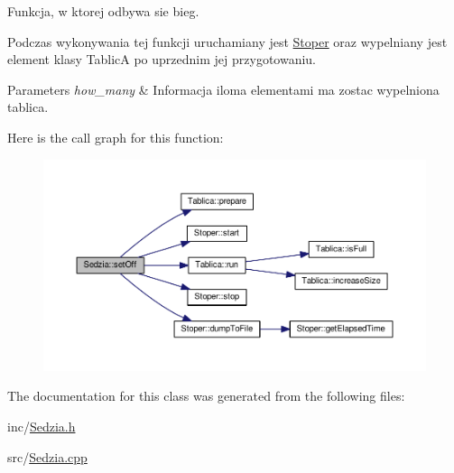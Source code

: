 Funkcja, w ktorej odbywa sie bieg. 

Podczas wykonywania tej funkcji uruchamiany jest \hyperlink{class_stoper}{Stoper} oraz wypelniany jest element klasy Tablic\-A po uprzednim jej przygotowaniu.


\begin{DoxyParams}{Parameters}
{\em how\-\_\-many} & Informacja iloma elementami ma zostac wypelniona tablica. \\
\hline
\end{DoxyParams}


Here is the call graph for this function\-:
\nopagebreak
\begin{figure}[H]
\begin{center}
\leavevmode
\includegraphics[width=350pt]{class_sedzia_a7ff9a723a873b366f96028394f79d8a7_cgraph}
\end{center}
\end{figure}




The documentation for this class was generated from the following files\-:\begin{DoxyCompactItemize}
\item 
inc/\hyperlink{_sedzia_8h}{Sedzia.\-h}\item 
src/\hyperlink{_sedzia_8cpp}{Sedzia.\-cpp}\end{DoxyCompactItemize}
